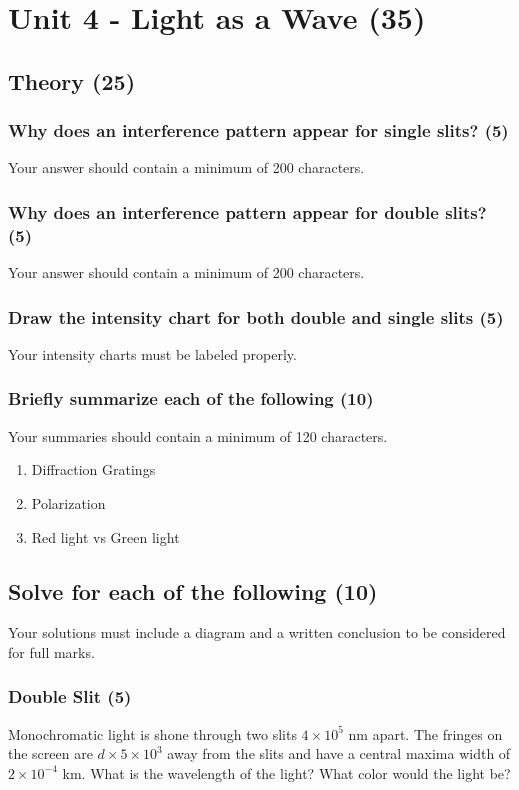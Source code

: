 \documentclass{article}
\begin{document}
\section{Unit 4 - Light as a Wave (35)}
\subsection{Theory (25)}
\subsubsection{Why does an interference pattern appear for single slits? (5)}
Your answer should contain a minimum of 200 characters.

\subsubsection{Why does an interference pattern appear for double slits? (5)}
Your answer should contain a minimum of 200 characters.

\subsubsection{Draw the intensity chart for both double and single slits (5)}
Your intensity charts must be labeled properly.

\subsubsection{Briefly summarize each of the following (10)}
Your summaries should contain a minimum of 120 characters.
\begin{enumerate}[label=\alph*)]
    \item Diffraction Gratings
    \item Polarization
    \item Red light vs Green light
\end{enumerate}\leavevmode

\subsection{Solve for each of the following (10)}
Your solutions must include a diagram and a written conclusion to be considered for full marks.

\subsubsection{Double Slit (5)}
Monochromatic light is shone through two slits $4 \times 10^5$ nm apart. The fringes on the screen are $d \times 5 \times 10^3$ away from the slits and have a central maxima width of $2 \times 10^{-4}$ km. What is the wavelength of the light? What color would the light be?
\end{document}
